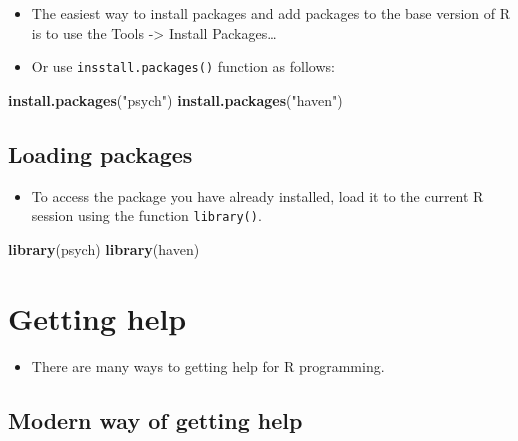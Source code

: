 \documentclass[
]{book}
\newenvironment{Shaded}{\begin{snugshade}}{\end{snugshade}}
\newcommand{\FunctionTok}[1]{\textcolor[rgb]{0.13,0.29,0.53}{\textbf{#1}}}
\newcommand{\NormalTok}[1]{#1}
\newcommand{\StringTok}[1]{\textcolor[rgb]{0.31,0.60,0.02}{#1}}
\providecommand{\tightlist}{%
  \setlength{\itemsep}{0pt}\setlength{\parskip}{0pt}}
\begin{document}
\begin{itemize}
\tightlist
\item
  The easiest way to install packages and add packages to the base version of R is to use the Tools -\textgreater{} Install Packages\ldots{}
\item
  Or use \texttt{insstall.packages()} function as follows:
\end{itemize}

\begin{Shaded}
\begin{Highlighting}[]
\FunctionTok{install.packages}\NormalTok{(}\StringTok{"psych"}\NormalTok{)}
\FunctionTok{install.packages}\NormalTok{(}\StringTok{"haven"}\NormalTok{)}
\end{Highlighting}
\end{Shaded}

\subsection{Loading packages}\label{loading-packages}

\begin{itemize}
\tightlist
\item
  To access the package you have already installed, load it to the current R session using the function \texttt{library()}.
\end{itemize}

\begin{Shaded}
\begin{Highlighting}[]
\FunctionTok{library}\NormalTok{(psych)}
\FunctionTok{library}\NormalTok{(haven)}
\end{Highlighting}
\end{Shaded}

\section{Getting help}\label{getting-help}

\begin{itemize}
\tightlist
\item
  There are many ways to getting help for R programming.
\end{itemize}

\subsection{Modern way of getting help}\label{modern-way-of-getting-help}
\end{document}
